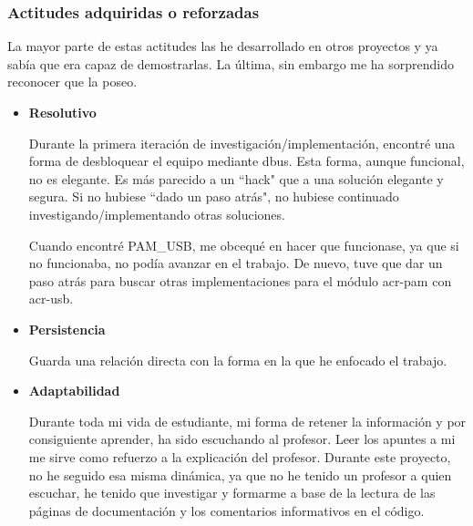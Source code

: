 \documentclass[twoside, titlepage, 12pt, a4paper]{article}
\begin{document}
\subsubsection{Actitudes adquiridas o reforzadas}
La mayor parte de estas actitudes las he desarrollado en otros proyectos y ya sabía que era capaz de demostrarlas. La última, sin embargo me ha sorprendido reconocer que la poseo.
\begin{itemize}
	\item{\textbf{Resolutivo}}\par Durante la primera iteración de investigación/implementación, encontré una forma de desbloquear el equipo mediante \gls{dbus}. Esta forma, aunque funcional, no es elegante. Es más parecido a un ``hack" que a una solución elegante y segura. Si no hubiese ``dado un paso atrás", no hubiese continuado investigando/implementando otras soluciones. \par Cuando encontré PAM\_USB, me obcequé en hacer que funcionase, ya que si no funcionaba, no podía avanzar en el trabajo. De nuevo, tuve que dar un paso atrás para buscar otras implementaciones para el módulo \gls{acr-pam} con \gls{acr-usb}.
	\item{\textbf{Persistencia}}\par Guarda una relación directa con la forma en la que he enfocado el trabajo.
	\item{\textbf{Adaptabilidad}}\par Durante toda mi vida de estudiante, mi forma de retener la información y por consiguiente aprender, ha sido escuchando al profesor. Leer los apuntes a mi me sirve como refuerzo a la explicación del profesor. Durante este proyecto, no he seguido esa misma dinámica, ya que no he tenido un profesor a quien escuchar, he tenido que investigar y formarme a base de la lectura de las páginas de documentación y los comentarios informativos en el código.
\end{itemize}
\end{document}

